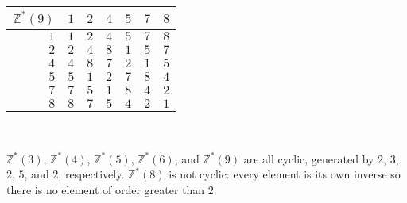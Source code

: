 \documentclass[oneside]{article}
\newcommand\bbZ{\mathbb{Z}}
\begin{document}
\begin{center}
    \begin{tabular} {r | c c c c c c}
      $\bbZ^*(9)$ & $1$ & $2$ & $4$ & $5$ & $7$ & $8$ \\
      \hline
      $1$ & $1$ & $2$ & $4$ & $5$ & $7$ & $8$ \\
      $2$ & $2$ & $4$ & $8$ & $1$ & $5$ & $7$ \\
      $4$ & $4$ & $8$ & $7$ & $2$ & $1$ & $5$ \\
      $5$ & $5$ & $1$ & $2$ & $7$ & $8$ & $4$ \\
      $7$ & $7$ & $5$ & $1$ & $8$ & $4$ & $2$ \\
      $8$ & $8$ & $7$ & $5$ & $4$ & $2$ & $1$ \\
    \end{tabular}\\[20pt]
  \end{center}

  $\bbZ^*(3)$, $\bbZ^*(4)$, $\bbZ^*(5)$, $\bbZ^*(6)$, and $\bbZ^*(9)$ are all cyclic, generated by $2$, $3$, $2$, $5$, and $2$, respectively. $\bbZ^*(8)$ is not cyclic: every element is its own inverse so there is no element of order greater than $2$.
\end{document}
